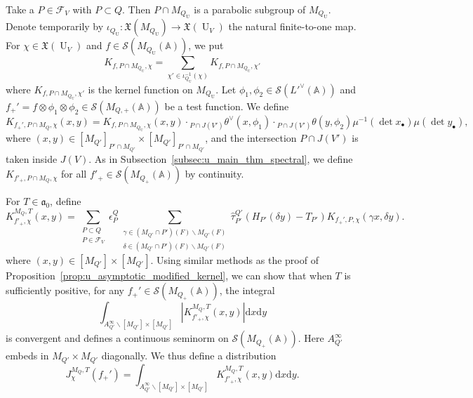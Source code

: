 \documentclass[letterpaper,11pt]{amsart}
\newcommand{\fa}{\mathfrak{a}}
\newcommand{\fX}{\mathfrak{X}}
\newcommand{\bA}{\mathbb{A}}
\newcommand{\cF}{\mathcal{F}}
\newcommand{\cS}{\mathcal{S}}
\newcommand{\rd}{\mathrm{d}}
\newcommand{\<}{\negthickspace}
\DeclareMathOperator{\U}{U}
\theoremstyle{definition}
\theoremstyle{plain}
\theoremstyle{remark}
\numberwithin{equation}{section}
\begin{document}
Take a $P\in \cF_V$ with $P \subset Q$. Then $P \cap M_{Q_{\U}}$ is a parabolic subgroup of $M_{Q_{\U}}$. Denote temporarily by $ \iota_{Q_{\U}}: \fX(M_{Q_{\U}}) \to \fX(\U_V)$
the natural finite-to-one map. For $\chi \in \fX(\U_V)$  and $f \in \cS(M_{Q_{\U}}(\bA))$, we put
    \[
    K_{f, P \cap M_{Q_{\U}}, \chi} = \sum_{\chi' \in \iota_{Q_{\U}}^{-1}(\chi)}
    K_{f, P \cap M_{Q_{\U}}, \chi'}
    \]
where $K_{f, P \cap M_{Q_{\U}}, \chi'}$ is the kernel function on $M_{Q_{\U}}$.
Let $\phi_1,\phi_2 \in \cS(L'^\vee(\bA))$ and $f_+'= f \otimes \phi_1 \otimes \phi_2 \in \cS(M_{Q, +}(\bA))$ be a test function.
We define
    \[
    K_{f_+',P \cap M_Q,\chi}(x, y) =
    K_{f, P \cap M_{Q_{\U}}, \chi}(x, y) \cdot
    {}_{P \cap J(V')}  \theta^\vee(x,\phi_1) \cdot
    {}_{P \cap J(V')} \theta(y, \phi_2)  \mu^{-1}(\det x_\bullet) \mu(\det y_\bullet),
    \]
where $(x, y) \in [M_{Q'}]_{P' \cap M_{Q'}} \times [M_{Q'}]_{P' \cap M_{Q'}}$, and the intersection $P \cap J(V')$ is taken inside $J(V)$.
As in
Subsection~\ref{subsec:u_main_thm_spectral}, we define $K_{f'_+,P \cap
M_Q,\chi}$ for all $f'_+ \in \cS(M_{Q_+}(\bA))$ by continuity.

For $T \in \fa_0$, define
    \[
     K_{f'_+,\chi}^{M_Q, T}(x, y) =
     \sum_{\substack{P \subset Q \\ P \in \cF_V}}
     \epsilon_P^Q \sum_{\substack{\gamma \in (M_{Q'} \cap P')(F)
     \backslash M_{Q'}(F) \\
     \delta \in (M_{Q'} \cap P')(F) \backslash M_{Q'}(F)}}
     \widehat{\tau}_{P'}^{Q'}(H_{P'}(\delta y)- T_{P'})
     K_{f_+', P,\chi}(\gamma x,\delta y).
    \]
where $(x, y) \in [M_{Q'}] \times [M_{Q'}]$. Using similar methods as the
proof of Proposition~\ref{prop:u_asymptotic_modified_kernel}, we can show
that when $T$ is sufficiently positive, for any $f_+' \in \cS(M_{Q_+}(\bA))$,
the integral
    \[
    \int_{ A_{Q'}^\infty \backslash [M_{Q'}] \times [M_{Q'}]}
    \left| K_{f'_+,\chi}^{M_Q,T}(x, y) \right| \rd x \rd y
    \]
is convergent and defines a continuous seminorm on $\cS(M_{Q_+}(\bA))$. Here $A_{Q'}^\infty$ embeds in $M_{Q'} \times M_{Q'}$ diagonally. We
thus define a distribution
    \[
    J_{\chi}^{M_{Q}, T}(f_+') =
    \int_{ A_{Q'}^\infty \backslash [M_{Q'}] \times [M_{Q'}]}
     K_{f'_+,\chi}^{M_Q,T}(x, y) \rd x \rd y.
    \]
\end{document}
